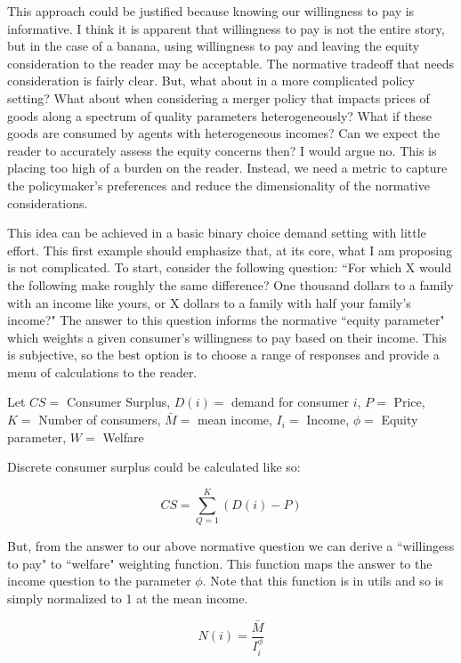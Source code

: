 \documentclass[11pt]{article}
\begin{document}
This approach could be justified because knowing our willingness to pay is informative. I think it is apparent that willingness to pay is not the entire story, but in the case of a banana, using willingness to pay and leaving the equity consideration to the reader may be acceptable. The normative tradeoff that needs consideration is fairly clear. But, what about in a more complicated policy setting? What about when considering a merger policy that impacts prices of goods along a spectrum of quality parameters heterogeneously? What if these goods are consumed by agents with heterogeneous incomes? Can we expect the reader to accurately assess the equity concerns then? I would argue no. This is placing too high of a burden on the reader. Instead, we need a metric to capture the policymaker's preferences and reduce the dimensionality of the normative considerations. 



This idea can be achieved in a basic binary choice demand setting with little effort. This first example should emphasize that, at its core, what I am proposing is not complicated. To start, consider the following question:  ``For which X would the following make roughly the same difference? One thousand dollars to a family with an income like yours, or X dollars to a family with half your family's income?" The answer to this question informs the normative ``equity parameter" which weights a given consumer's willingness to pay based on their income. This is subjective, so the best option is to choose a range of responses and provide a menu of calculations to the reader. 

Let $CS =$ Consumer Surplus, $D(i)=$ demand for consumer $i$, $P =$ Price, $K =$ Number of consumers, 
$\bar{M} =$ mean income, $I_i =$ Income, $\phi =$ Equity parameter, $W = $ Welfare   

Discrete consumer surplus could be calculated like so: 

$$  CS = \sum_{Q = 1}^{K} (D(i) - P) $$

But, from the answer to our above normative question we can derive a ``willingess to pay" to ``welfare" weighting function. This function maps the answer to the income question to the parameter $\phi$. Note that this function is in utils and so is simply normalized to 1 at the mean income. 

$$ N(i) = \frac{\bar{M}}{I_i^\phi} $$
\end{document}
